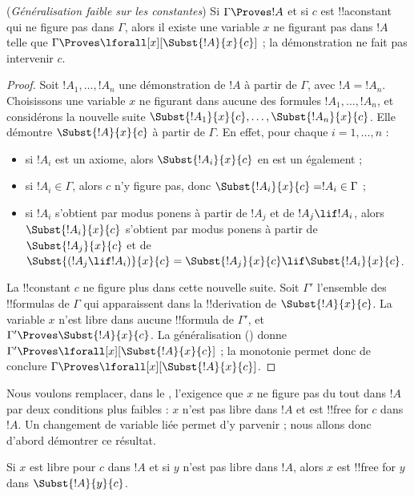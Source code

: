 \documentclass[../../../include/open-logic-section]{subfiles}
\begin{document}
\begin{thm}
(\emph{Généralisation faible sur les constantes})
Si $\Gamma\Proves !A$ et si $c$ est !!a{constant} qui
ne figure pas dans $\Gamma$, alors il existe une variable
$x$ ne figurant pas dans $!A$ telle que
$\Gamma\Proves\lforall[x][\Subst{!A}{x}{c}]$ ; la
démonstration ne fait pas intervenir $c$.
\end{thm}

\begin{proof}
Soit $!A_1,\ldots,!A_n$ une démonstration de $!A$ à partir
de $\Gamma$, avec $!A=!A_n$. Choisissons une variable $x$
ne figurant dans aucune des formules $!A_1,\ldots,!A_n$,
et considérons la nouvelle suite
$\Subst{!A_1}{x}{c},\ldots,\Subst{!A_n}{x}{c}$.
Elle démontre $\Subst{!A}{x}{c}$ à partir de $\Gamma$.
En effet, pour chaque $i=1,\ldots,n$ :
\begin{itemize}
\item si $!A_i$ est un axiome, alors
$\Subst{!A_i}{x}{c}$ en est un également ;
\item si $!A_i\in\Gamma$, alors $c$ n'y figure pas, donc
$\Subst{!A_i}{x}{c}=!A_i\in\Gamma$ ;
\item si $!A_i$ s'obtient par modus ponens à partir de
$!A_j$ et de $!A_j\lif !A_i$, alors
$\Subst{!A_i}{x}{c}$ s'obtient par modus ponens à partir de
$\Subst{!A_j}{x}{c}$ et de
$\Subst{(!A_j\lif !A_i)}{x}{c}
=\Subst{!A_j}{x}{c}\lif\Subst{!A_i}{x}{c}$.
\end{itemize}
La !!{constant} $c$ ne figure plus dans cette nouvelle
suite. Soit $\Gamma'$ l'ensemble des !!{formula}s de
$\Gamma$ qui apparaissent dans la !!{derivation} de
$\Subst{!A}{x}{c}$. La variable $x$ n'est libre dans aucune
!!{formula} de $\Gamma'$, et
$\Gamma'\Proves\Subst{!A}{x}{c}$. La généralisation
() donne
$\Gamma'\Proves\lforall[x][\Subst{!A}{x}{c}]$ ; la
monotonie permet donc de conclure
$\Gamma\Proves\lforall[x][\Subst{!A}{x}{c}]$.
\end{proof}

\begin{explain}
Nous voulons remplacer, dans le , l'exigence
que $x$ ne figure pas du tout dans $!A$ par deux conditions
plus faibles : $x$ n'est pas libre dans $!A$ et est
!!{free for} $c$ dans $!A$. Un changement de variable liée
permet d'y parvenir ; nous allons donc d'abord démontrer
ce résultat.
\end{explain}

\begin{lem}
Si $x$ est libre pour $c$ dans $!A$ et si $y$ n'est pas
libre dans $!A$, alors $x$ est !!{free for} $y$ dans
$\Subst{!A}{y}{c}$.
\end{lem}
\end{document}
